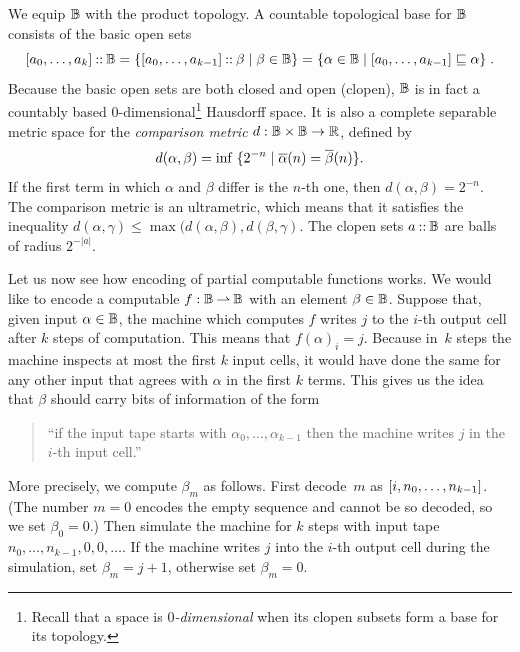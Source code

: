 We equip $\mathbb{B}$ with the product topology. A countable topological
base for $\mathbb{B}$ consists of the basic open sets
%
\begin{equation*}
  [a_0, \ldots, a_k] \mathbin{{:}{:}} \mathbb{B}
  = \{[a_0, \ldots, a_{k-1}] \mathbin{{:}{:}} \beta \mid \beta \in \mathbb{B}\}
  = \{\alpha \in \mathbb{B} \mid [a_0, \ldots, a_{k-1}]
    \sqsubseteq \alpha\}
  \;.
\end{equation*}
%
Because the basic open sets are both closed and open (clopen),
$\mathbb{B}$ is in fact a countably based $0$-dimensional\footnote{Recall
  that a space is \emph{$0$-dimensional} when its clopen subsets form
  a base for its topology.} Hausdorff space. It is also a complete
separable metric space for the \emph{comparison metric} $d : \mathbb{B}
\times \mathbb{B} \to \mathbb{R}$, defined by
%
\begin{equation*}
  d(\alpha, \beta) = \inf \;\{2^{-n} \mid
    \overline{\alpha}(n) = \overline{\beta}(n)\}.
\end{equation*}
%
If the first term in which $\alpha$ and $\beta$ differ is the $n$-th
one, then $d(\alpha, \beta) = 2^{-n}$. The comparison metric is an
ultrametric, which means that it satisfies the inequality $d(\alpha,
\gamma) \leq \max(d(\alpha, \beta), d(\beta, \gamma)$. The clopen sets
$a \mathbin{{:}{:}} \mathbb{B}$ are balls of radius $2^{-|a|}$.

Let us now see how encoding of partial computable functions works. We
would like to encode a computable $f : \mathbb{B} \mathbin{\rightharpoonup} \mathbb{B}$ with an
element $\beta \in \mathbb{B}$. Suppose that, given input $\alpha \in
\mathbb{B}$, the machine which computes $f$ writes $j$ to the $i$-th
output cell after $k$ steps of computation. This means that
$f(\alpha)_i = j$. Because in~$k$ steps the machine inspects at most
the first $k$ input cells, it would have done the same for any other
input that agrees with $\alpha$ in the first $k$ terms. This gives us
the idea that $\beta$ should carry bits of information of the form
%
\begin{quote}
  ``if the input tape starts with $\alpha_0, \ldots,
  \alpha_{k-1}$ then the machine writes $j$ in the $i$-th input
  cell.''
\end{quote}
%
More precisely, we compute $\beta_m$ as follows. First decode~$m$ as
$[i, n_0, \ldots, n_{k-1}]$. (The number $m = 0$ encodes the empty
sequence and cannot be so decoded, so we set $\beta_0 = 0$.) Then
simulate the machine for $k$ steps with input tape $n_0, \ldots,
n_{k-1}, 0, 0, \ldots$. If the machine writes $j$ into the $i$-th
output cell during the simulation, set $\beta_m = j + 1$, otherwise
set $\beta_m = 0$.

